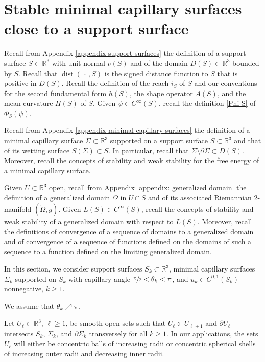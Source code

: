 \documentclass[11pt]{amsart}
\begin{document}
		\section{Stable minimal capillary surfaces close to a support surface}

	Recall from Appendix \ref{appendix support surfaces} the definition of a support surface $S\subset \mathbb{R}^3$ with unit normal $\nu(S)$ and of the domain $D(S)\subset \mathbb{R}^3$ bounded by $S$.  Recall that $\operatorname{dist}(\,\cdot\,,S)$ is the signed distance function to $S$ that is positive in $D(S)$. Recall  the definition of the reach $i_S$ of $S$ and our conventions for the second fundamental form $h(S)$, the shape operator $A(S)$, and the mean curvature $H(S)$ of $S$. Given $\psi \in C^\infty(S)$, recall the definition \eqref{Phi S} of $\Phi_S(\psi)$.


Recall from Appendix \ref{appendix minimal capillary surfaces}  the  definition of a minimal capillary surface $\Sigma \subset \mathbb{R}^3$ supported on a support surface $S\subset \mathbb{R}^3$  and that of its  wetting surface $S(\Sigma)\subset S$. In particular, recall that  $\Sigma\setminus \partial \Sigma \subset D(S)$.  Moreover, recall the concepts of  stability and weak stability for the free energy  of a minimal capillary surface.
 
Given $U\subset \mathbb{R}^3$ open, recall from Appendix \ref{appendix: generalized domain} the definition of a generalized domain $\Omega$ in $U\cap S$ and of its associated Riemannian 2-manifold $(\tilde \Omega,g)$. Given $L(S)\in C^\infty(S)$, recall the concepts of  stability and weak stability of a generalized domain  with respect to $L(S)$.  Moreover, recall the definitions of convergence of a sequence of domains to a generalized domain and of convergence of a sequence of functions defined on the domains of such a sequence to a function defined on the limiting generalized domain.
	
	
	In this section,  we consider   support surfaces $S_k\subset \mathbb{R}^3$, minimal capillary surfaces $\Sigma_k$ supported on $S_k$ with capillary angle $\sfrac{\pi}2<\theta_k<\pi$, and  $u_k\in C^{0,1}(S_k)$ nonnegative, $k\geq 1$.
	
	
	 
	
	 We assume that $\theta_k\nearrow \pi$.
	 
	 Let $U_\ell\subset \mathbb{R}^3$, $\ell \geq 1$, be smooth  open sets   such that $U_\ell\Subset U_{\ell+1}$ and   $\partial U_\ell$ intersects $S_k$, $\Sigma_k$, and $\partial \Sigma_k$ transversely for all $k\geq 1$. In our applications, the sets $U_\ell$ will either be concentric balls of increasing radii or concentric spherical shells of increasing outer radii and decreasing inner radii. 
	 
\end{document}
